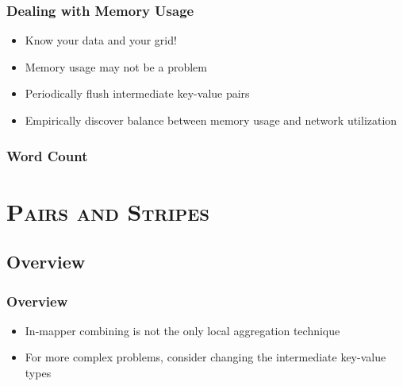 \documentclass[xcolor=x11names,compress]{beamer}
\renewcommand{\(}{\begin{columns}}
\renewcommand{\)}{\end{columns}}
\newcommand{\<}[1]{\begin{column}{#1}}
\renewcommand{\>}{\end{column}}
\begin{document}
\begin{frame}
  \frametitle{Dealing with Memory Usage}
  \begin{itemize}
  \item<1,2> Know your data and your grid!
  \item<2> Memory usage may not be a problem
  \item<3,4> Periodically flush intermediate key-value pairs
  \item<4> Empirically discover balance between memory usage and
    network utilization
  \end{itemize}
\end{frame}

\begin{frame}
  \frametitle{Word Count}
  \scriptsize
  \begin{algorithm}[H]
  \end{algorithm}
\end{frame}

\section{\scshape Pairs and Stripes}

\subsection{Overview}

\begin{frame}
  \frametitle{Overview}
  \begin{itemize}
  \item<1> In-mapper combining is not the only local aggregation technique
  \item<2> For more complex problems, consider changing the
    intermediate key-value types
  \end{itemize}
\end{frame}
\end{document}
